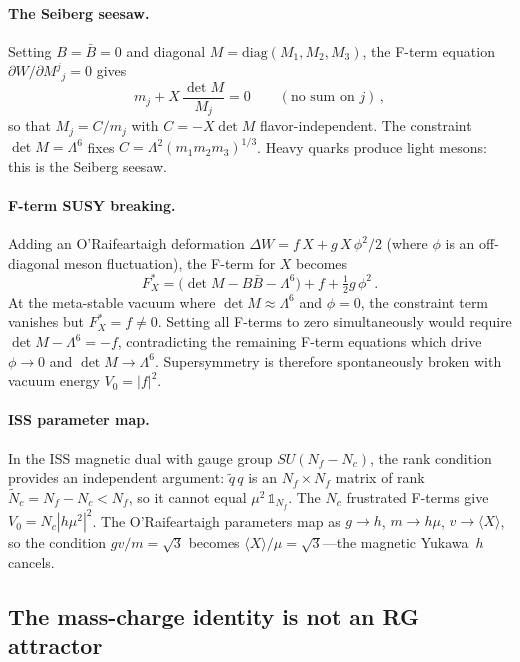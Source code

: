 \documentclass[12pt,a4paper]{article}
\begin{document}
\paragraph{The Seiberg seesaw.}
Setting $B = \bar B = 0$ and diagonal $M = \mathrm{diag}(M_1,M_2,M_3)$,
the F-term equation $\partial W/\partial M^j{}_j = 0$ gives
\begin{equation}
  m_j + X\,\frac{\det M}{M_j} = 0
  \qquad(\text{no sum on } j)\,,
\end{equation}
so that $M_j = C/m_j$ with $C = -X\det M$ flavor-independent.
The constraint $\det M = \Lambda^6$ fixes
$C = \Lambda^2(m_1 m_2 m_3)^{1/3}$. Heavy quarks produce light
mesons: this is the Seiberg seesaw.

\paragraph{F-term SUSY breaking.}
Adding an O'Raifeartaigh deformation $\Delta W = f\,X + g\,X\,\phi^2/2$
(where $\phi$ is an off-diagonal meson fluctuation), the F-term
for $X$ becomes
\begin{equation}
  F_X^* = \bigl(\det M - B\bar B - \Lambda^6\bigr) + f
  + \tfrac{1}{2}g\,\phi^2\,.
\end{equation}
At the meta-stable vacuum where $\det M \approx \Lambda^6$ and
$\phi = 0$, the constraint term vanishes but $F_X^* = f \neq 0$.
Setting all F-terms to zero simultaneously would require
$\det M - \Lambda^6 = -f$, contradicting the remaining F-term
equations which drive $\phi \to 0$ and $\det M \to \Lambda^6$.
Supersymmetry is therefore spontaneously broken with vacuum
energy $V_0 = |f|^2$.

\paragraph{ISS parameter map.}
In the ISS magnetic dual with gauge group $SU(N_f - N_c)$,
the rank condition provides an independent argument:
$\tilde q \, q$ is an $N_f \times N_f$ matrix of rank
$\tilde N_c = N_f - N_c < N_f$, so it cannot equal
$\mu^2\,\mathbb{1}_{N_f}$. The $N_c$ frustrated F-terms
give $V_0 = N_c|h\mu^2|^2$.
The O'Raifeartaigh parameters map as
$g \to h$, $m \to h\mu$, $v \to \langle X\rangle$, so the
condition $gv/m = \sqrt{3}$ becomes
$\langle X\rangle/\mu = \sqrt{3}$---the magnetic Yukawa~$h$ cancels.

\subsection{The mass-charge identity is not an RG attractor}
\end{document}
